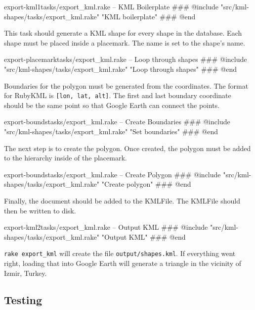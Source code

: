 \documentclass[12pt]{article}
\begin{document}
\begin{code}{export-kml1}{tasks/export\_kml.rake -- KML Boilerplate}
### @include "src/kml-shapes/tasks/export_kml.rake" "KML boilerplate"
### @end
\end{code}

This task should generate a KML shape for every shape in the database.  Each shape must be placed inside a placemark.  The name is set to the shape's name.

\begin{code}{export-placemark}{tasks/export\_kml.rake -- Loop through shapes}
### @include "src/kml-shapes/tasks/export_kml.rake" "Loop through shapes"
### @end
\end{code}

Boundaries for the polygon must be generated from the coordinates.  The format for RubyKML is \texttt{[lon, lat, alt]}.  The first and last boundary coordinate should be the same point so that Google Earth can connect the points.

\begin{code}{export-bounds}{tasks/export\_kml.rake -- Create Boundaries}
### @include "src/kml-shapes/tasks/export_kml.rake" "Set boundaries"
### @end
\end{code}

The next step is to create the polygon.  Once created, the polygon must be added to the hierarchy inside of the placemark.

\begin{code}{export-bounds}{tasks/export\_kml.rake -- Create Polygon}
### @include "src/kml-shapes/tasks/export_kml.rake" "Create polygon"
### @end
\end{code}

Finally, the document should be added to the KMLFile.  The KMLFile should then be written to disk.


\begin{code}{export-kml2}{tasks/export\_kml.rake -- Output KML}
### @include "src/kml-shapes/tasks/export_kml.rake" "Output KML"
### @end
\end{code}

\texttt{rake export\_kml} will create the file \texttt{output/shapes.kml}.  If everything went right, loading that into Google Earth will generate a triangle in the vicinity of Izmir, Turkey.

\subsection*{Testing}
\end{document}
